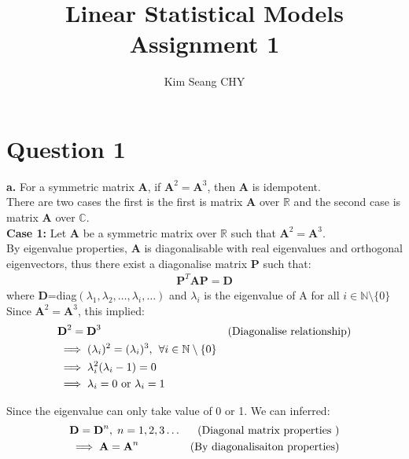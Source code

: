 \documentclass[12 pt, a4paper]{article}
\title{Linear Statistical Models Assignment 1}
\date{}
\author{Kim Seang CHY}
\begin{document}
\maketitle


\section*{Question 1}
\textbf{a.} For a symmetric matrix \textbf{A}, if $\textbf{A}^2=\textbf{A}^3$, then \textbf{A} is idempotent.\\

\noindent There are two cases the first is the first is matrix \textbf{A} over $\mathbb{R}$ and the second case is matrix \textbf{A} over $\mathbb{C}$.\\

\noindent \textbf{Case 1:} Let \textbf{A} be a symmetric matrix over $\mathbb{R}$ such that $\textbf{A}^2=\textbf{A}^3$.\\

\noindent By eigenvalue properties,  \textbf{A} is diagonalisable with real eigenvalues and orthogonal eigenvectors, thus there exist a diagonalise matrix \textbf{P} such that:
\begin{align*}
\textbf{P}^T\textbf{AP}=\textbf{D}
\end{align*}
where \textbf{D}=diag$(\lambda_1,\lambda_2, \ldots,\lambda_i,\ldots)$ and $\lambda_i$ is the eigenvalue of A for all $i \in \mathbb{N} \setminus \{0\}$ \\

\noindent Since $\textbf{A}^2=\textbf{A}^3$,  this implied:
\begin{align*}
&\textbf{D}^2=\textbf{D}^3 &\text{(Diagonalise relationship)} \\
&\implies (\lambda_i)^2=(\lambda_i)^3,  \hspace{0.15cm} \forall i \in \mathbb{N} \setminus \{0\} &\\
&\implies \lambda_i^2(\lambda_i-1) = 0  & \\
&\implies \lambda_i =0 \text{ or } \lambda_i = 1 \\
\end{align*}

\noindent Since the eigenvalue can only take value of 0 or 1.  We can inferred:
\begin{align*}
&\textbf{D}=\textbf{D}^n,  \hspace{0.1cm} n=1,2,3\ldots & (\text{Diagonal matrix properties })\\
&\implies \textbf{A}=\textbf{A}^n & (\text{By diagonalisaiton properties})
\end{align*}
\end{document}
